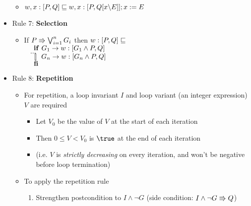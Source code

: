\begin{itemize}
	\begin{itemize}
	
	\item $ w, x : [P, Q] \mathrel{\sqsubseteq} w, x : [P, Q[x \backslash E]]; x := E $
	
	\end{itemize}

	\item Rule 7: \textbf{Selection}
	
	\begin{itemize}
		
		\item If $ P \Rrightarrow \bigvee_{i=1}^{n} G_i $ then $ w : [P, Q] \mathrel{\sqsubseteq} $\\
		$ ~~~~ {\bf if} ~ G_1 \rightarrow w : [G_1 \land P, Q] $\\
		$ ~~~~ \dots $\\
		$ ~~~~ \mathrel{\tt [\hspace*{-1pt}]} ~ G_n \rightarrow w: [G_n \land P, Q] $\\
		$ ~~~~ {\bf fi} $
		
	\end{itemize}

	\item Rule 8: \textbf{Repetition}
	
	\begin{itemize}
		
		\item For repetition, a loop invariant $ I $ and loop variant (an integer expression) $ V $ are required
		
		\begin{itemize}
			
			\item Let $ V_0 $ be the value of $ V $ at the start of each iteration
			
			\item Then $ 0 \le V < V_0 $ is $ \true $ at the end of each iteration
			
			\item (i.e. $ V $ is \textit{strictly decreasing} on every iteration, and won't be negative before loop termination)
			
		\end{itemize}
	
	\item To apply the repetition rule
	
		\begin{enumerate}
			
			\item Strengthen postcondition to $ I \land \lnot G $ (side condition: $ I \land \lnot G \Rrightarrow Q $)
			

\end{enumerate}
\end{itemize}
\end{itemize}
